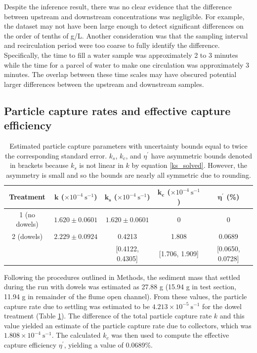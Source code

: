 \documentclass[12pt]{article}
\begin{document}
Despite the inference result, there was no clear evidence that the difference between upstream and downstream concentrations was negligible. For example, the dataset may not have been large enough to detect significant differences on the order of tenths of g/L. Another consideration was that the sampling interval and recirculation period were too coarse to fully identify the difference. Specifically, the time to fill a water sample was approximately 2 to 3 minutes while the time for a parcel of water to make one circulation was approximately 3 minutes. The overlap between these time scales may have obscured potential larger differences between the upstream and downstream samples.

\subsection{Particle capture rates and effective capture efficiency}

\begin{table}[H]
    \centering
    \caption{Estimated particle capture parameters with uncertainty bounds equal to twice the corresponding standard error. $k_s$, $k_c$, and $\eta^\prime$ have asymmetric bounds denoted in brackets because $k_s$ is not linear in $k$ by equation \ref{ks_solved}. However, the asymmetry is small and so the bounds are nearly all symmetric due to rounding.}
    \label{tab_detailedestimates}
    \begin{tabular}{c c c c c}
        \textbf{Treatment} & $\boldsymbol{k}$ ($\times 10^{-4} \ \text{s}^{-1}$) & $\boldsymbol{k_s}$ ($\times 10^{-4} \ \text{s}^{-1}$) & $\boldsymbol{k_c}$ ($\times 10^{-4} \ \text{s}^{-1}$) & $\boldsymbol{\eta^\prime}$ (\%) \\
        \hline
        1 (no dowels) & $1.620 \pm 0.0601$ & $1.620 \pm 0.0601$ & 0 & 0 \\
        \hline
        2 (dowels) & $2.229 \pm 0.0924$ & 0.4213 & 1.808 & 0.0689 \\
         & & [0.4122, 0.4305] & [1.706, 1.909] & [0.0650, 0.0728] \\
        \hline
    \end{tabular}
\end{table}

Following the procedures outlined in Methods, the sediment mass that settled during the run with dowels was estimated as 27.88 g (15.94 g in test section, 11.94 g in remainder of the flume open channel). From these values, the particle capture rate due to settling was estimated to be $4.213 \times 10^{-5} \ \text{s}^{-1}$ for the dowel treatment (Table \ref{tab_detailedestimates}). The difference of the total particle capture rate $k$ and this value yielded an estimate of the particle capture rate due to collectors, which was $1.808 \times 10^{-4} \ \text{s}^{-1}$. The calculated $k_c$ was then used to compute the effective capture efficiency $\eta^\prime$, yielding a value of 0.0689\%.
\end{document}
